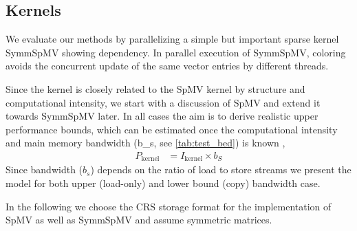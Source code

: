 \subsection{Kernels} \label{subsec:test_kernels}
We evaluate our methods by parallelizing a simple but important sparse kernel \acrfull{SymmSpMV} showing \DTWO dependency. In parallel execution of \acrshort{SymmSpMV}, \DTWO coloring avoids the concurrent update of the same vector entries by different threads. 


Since the kernel is closely related to the \acrshort{SpMV} kernel by structure and computational intensity, we start with a discussion of \acrshort{SpMV} and extend it towards \acrshort{SymmSpMV} later. In all cases the aim is to derive realistic upper performance bounds, which can be estimated once the computational intensity and main memory bandwidth (\acrshort{b_s}, see \cref{tab:test_bed}) is known \cite{Williams_roofline}, \ie
  \begin{align}
   	\label{eq:upper_performance}
   	P_\mathrm{kernel}  &= I_\mathrm{kernel}  \times b_S
  \end{align}
Since bandwidth ($b_s$) depends on the ratio of load to store streams we present the model for both upper (load-only) and lower bound (copy) bandwidth case.  
  
  In the following we choose the \acrshort{CRS} storage format for the  implementation of \acrshort{SpMV} as well as  \acrshort{SymmSpMV} and assume symmetric matrices.

